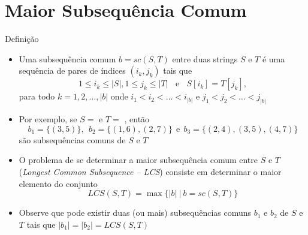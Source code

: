 \section{Maior Subsequência Comum}

\begin{frame}[fragile]{Definição}

    \begin{itemize}
        \item Uma subsequência comum $b = sc(S, T)$ entre duas strings $S$ e $T$ é uma sequência de
            pares de índices $(i_k, j_k)$ tais que 
        \[
            1\leq i_k\leq |S|, 1\leq j_k\leq |T| \ \ \ \ \mbox{e}\ \ \ \ S[i_k] = T[j_k],
        \]para todo $k = 1, 2, \ldots, |b|$ onde $i_1 < i_2 < \ldots < i_{|b|}$ e $j_1 < j_2 < \ldots < j_{|b|}$
        \pause

        \item  Por exemplo, se $S = $  e $T = $ , então
        \[
            b_1 = \lbrace (3, 5)\rbrace, \ \ b_2 = \lbrace (1, 6), (2, 7)\rbrace\ \ \mbox{e}\ \ b_3 = \lbrace (2, 4), (3, 5), (4, 7)\rbrace
        \] são subsequências comuns de $S$ e $T$
        \pause

        \item O problema de se determinar a maior subsequência comum entre $S$ e $T$
            (\textit{Longest Common Subsequence -- LCS}) consiste em determinar o maior
            elemento do conjunto
        \[
            LCS(S, T) = \max \lbrace |b|\ | \ b = sc(S, T)\rbrace
        \]
        \pause
        \item Observe que pode existir duas (ou mais)
            subsequências comuns $b_1$ e $b_2$ de $S$ e $T$ tais que $|b_1| = |b_2| = LCS(S, T)$

    \end{itemize}

\end{frame}

